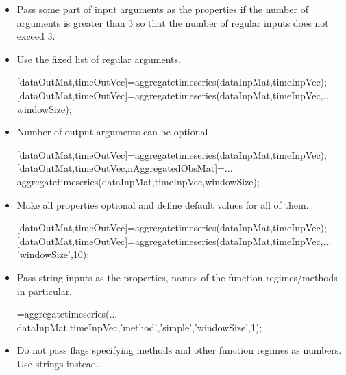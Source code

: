 \documentclass[titlepage,a4paper,12pt]{article}
\begin{document}
\begin{itemize}
\item
Pass some part of input arguments as the properties if the number of
arguments is greater than 3 so that the number of regular inputs
does not exceed 3.


\item

Use the fixed list of regular arguments.

\begin{verbmcode}
[dataOutMat,timeOutVec]=aggregatetimeseries(dataInpMat,timeInpVec);
[dataOutMat,timeOutVec]=aggregatetimeseries(dataInpMat,timeInpVec,...
    windowSize);
\end{verbmcode}

\item Number of output arguments can be optional

\begin{verbmcode}
[dataOutMat,timeOutVec]=aggregatetimeseries(dataInpMat,timeInpVec);
[dataOutMat,timeOutVec,nAggregatedObsMat]=...
    aggregatetimeseries(dataInpMat,timeInpVec,windowSize);
\end{verbmcode}


\item

Make all properties optional and define default values for all of
them.

\begin{verbmcode}
[dataOutMat,timeOutVec]=aggregatetimeseries(dataInpMat,timeInpVec);
[dataOutMat,timeOutVec]=aggregatetimeseries(dataInpMat,timeInpVec,...
    'windowSize',10);

\end{verbmcode}

\item

Pass string inputs as the properties, names of the function regimes/methods
in particular.
\begin{verbmcode}
=aggregatetimeseries(...
dataInpMat,timeInpVec,'method','simple','windowSize',1);
\end{verbmcode}

\item

Do not pass flags specifying methods and other function regimes as
numbers. Use strings instead.



\end{itemize}
\end{document}
